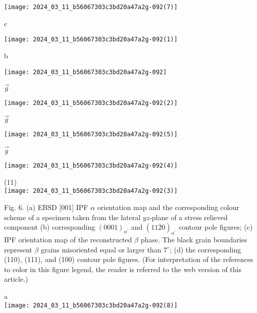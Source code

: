 \documentclass[10pt]{article}
\begin{document}
\begin{center}
\texttt{[image: 2024\_03\_11\_b56067303c3bd20a47a2g-092(7)]}
\end{center}

c

\begin{center}
\texttt{[image: 2024\_03\_11\_b56067303c3bd20a47a2g-092(1)]}
\end{center}

b

\begin{center}
\texttt{[image: 2024\_03\_11\_b56067303c3bd20a47a2g-092]}
\end{center}

$\vec{g}$

\begin{center}
\texttt{[image: 2024\_03\_11\_b56067303c3bd20a47a2g-092(2)]}
\end{center}

$\vec{g}$

\begin{center}
\texttt{[image: 2024\_03\_11\_b56067303c3bd20a47a2g-092(5)]}
\end{center}

$\vec{g}$

\begin{center}
\texttt{[image: 2024\_03\_11\_b56067303c3bd20a47a2g-092(4)]}
\end{center}

(11)\\
\texttt{[image: 2024\_03\_11\_b56067303c3bd20a47a2g-092(3)]}

Fig. 6. (a) EBSD [001] IPF $\alpha$ orientation map and the corresponding colour scheme of a specimen taken from the lateral $y z$-plane of a stress relieved component (b) corresponding $(0001)_{\alpha^{\prime}}$ and $(11 \overline{2} 0)_{\alpha^{\prime}}$ contour pole figures; (c) IPF orientation map of the reconstructed $\beta$ phase. The black grain boundaries represent $\beta$ grains misoriented equal or larger than $7^{\circ}$; (d) the corresponding (110), (111), and (100) contour pole figures. (For interpretation of the references to color in this figure legend, the reader is referred to the web version of this article.)

a\\
\texttt{[image: 2024\_03\_11\_b56067303c3bd20a47a2g-092(8)]}
\end{document}

